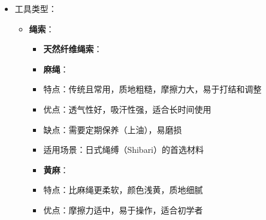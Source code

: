 \documentclass[12pt,UTF8]{ctexbook}
\begin{document}
\begin{itemize}
\begin{itemize}
\begin{itemize}
      \item \textbf{进阶绳缚技术}：
        \begin{itemize}
        \item \textbf{复杂绳缚图案}：
          \item 龟甲绑（Kikkou）：胸部或背部的菱形图案，需要精确的绳索排列
          \item 蛛网绑（Kumo）：类似蜘蛛网的复杂图案，覆盖更大面积
        \item \textbf{悬挂捆绑安全要点}（需专业指导）：
          \item 学习专业课程：悬挂捆绑需要专业知识和技能，不建议自学
          \item 设备要求：使用专业的悬挂点和安全设备，确保承重能力
          \item 承重分布：将重量均匀分布在多个支撑点，避免单点承重
          \item 姿势选择：避免压迫内脏和重要血管，选择安全的悬挂姿势
        \item \textbf{进阶安全考虑}：
          \item 学习解剖学：深入了解人体结构，特别是神经和血管的位置
          \item 练习和经验：在专业指导下逐步练习，积累经验
          \item 应急准备：制定详细的应急计划，包括如何快速解除复杂捆绑
          \item 定期检查：定期检查绳索和设备的状况，确保安全使用
        \end{itemize}
      \end{itemize}
    \item 工具类型：
      \begin{itemize}
      \item \textbf{绳索}：
        \begin{itemize}
        \item \textbf{天然纤维绳索}：
          \item \textbf{麻绳}：
            \item 特点：传统且常用，质地粗糙，摩擦力大，易于打结和调整
            \item 优点：透气性好，吸汗性强，适合长时间使用
            \item 缺点：需要定期保养（上油），易磨损
            \item 适用场景：日式绳缚（Shibari）的首选材料
          \item \textbf{黄麻}：
            \item 特点：比麻绳更柔软，颜色浅黄，质地细腻
            \item 优点：摩擦力适中，易于操作，适合初学者

\end{itemize}
\end{itemize}
\end{itemize}
\end{itemize}
\end{document}
